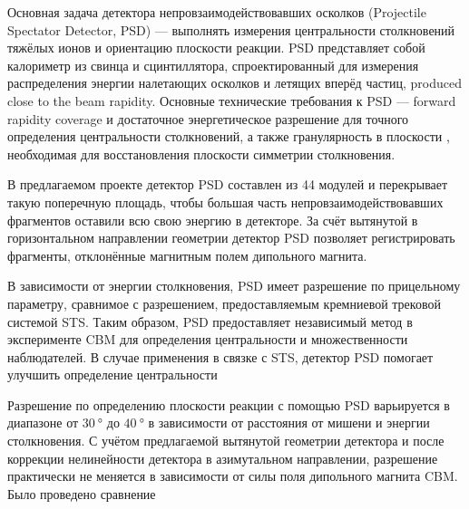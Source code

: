 \begin{minipage}[t]{0.495\textwidth}
Основная задача детектора непровзаимодействовавших осколков (Projectile Spectator Detector, PSD) --- выполнять измерения центральности столкновений тяжёлых ионов и ориентацию плоскости реакции. PSD представляет собой калориметр из свинца и сцинтиллятора, спроектированный для измерения распределения энергии налетающих осколков и летящих вперёд частиц, produced close to the beam rapidity.
Основные технические требования к PSD --- forward rapidity coverage и достаточное энергетическое разрешение для точного определения центральности столкновений, а также гранулярность в плоскости \todo, необходимая для восстановления плоскости симметрии столкновения. \\
\end{minipage}

В предлагаемом проекте детектор PSD составлен из 44 модулей и перекрывает такую поперечную площадь, чтобы большая часть непровзаимодействовавших фрагментов оставили всю свою энергию в детекторе. За счёт вытянутой в горизонтальном направлении геометрии детектор PSD позволяет регистрировать фрагменты, отклонённые магнитным полем дипольного магнита.

В зависимости от энергии столкновения, PSD имеет разрешение по прицельному параметру, сравнимое с разрешением, предоставляемым кремниевой трековой системой STS. Таким образом, PSD предоставляет независимый метод в эксперименте CBM для определения центральности и множественности наблюдателей. В случае применения в связке с STS, детектор PSD помогает улучшить определение центральности 

Разрешение по определению плоскости реакции с помощью PSD варьируется в диапазоне от $\SI{30}{\degree}$ до $\SI{40}{\degree}$ в зависимости от расстояния от мишени и энергии столкновения. С учётом предлагаемой вытянутой геометрии детектора и после коррекции нелинейности детектора в азимутальном направлении, разрешение практически не меняется в зависимости от силы поля дипольного магнита CBM. Было проведено сравнение 

